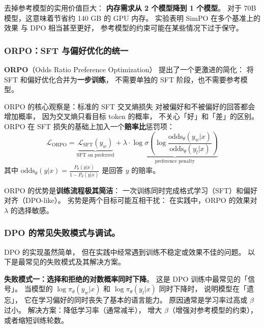 去掉参考模型的实用价值巨大：
\textbf{内存需求从 2 个模型降到 1 个模型}。
对于 70B 模型，这意味着节省约 140 GB 的 GPU 内存。
实验表明 SimPO 在多个基准上的效果
与 DPO 相当甚至更好，
参考模型的约束可能在某些情况下过于保守。

\subsubsection{ORPO：SFT 与偏好优化的统一}


\textbf{ORPO}（Odds Ratio Preference Optimization）
提出了一个更激进的简化：
将 SFT 和偏好优化合并为\textbf{一步训练}，
不需要单独的 SFT 阶段，也不需要参考模型。

ORPO 的核心观察是：标准的 SFT 交叉熵损失
对被偏好和不被偏好的回答都会增加概率，
因为交叉熵只看目标 token 的概率，
不关心「好」和「差」的区别。
ORPO 在 SFT 损失的基础上加入一个\textbf{赔率比}惩罚项：
\begin{equation}
  \mathcal{L}_{\text{ORPO}} = \underbrace{
    \mathcal{L}_{\text{SFT}}(y_w)
  }_{\text{SFT on preferred}} + \lambda \cdot \underbrace{
    \log \sigma\!\left(
      \log \frac{\text{odds}_\theta(y_w|x)}{\text{odds}_\theta(y_l|x)}
    \right)
  }_{\text{preference penalty}}
  \label{eq:orpo}
\end{equation}
其中 $\text{odds}_\theta(y|x) = \frac{P_\theta(y|x)}{1 - P_\theta(y|x)}$
是回答 $y$ 的赔率。

ORPO 的优势是\textbf{训练流程极其简洁}：
一次训练同时完成格式学习（SFT）和偏好对齐（DPO-like）。
劣势是两个目标可能互相干扰：
在实践中，ORPO 的效果对 $\lambda$ 的选择敏感。

\subsubsection{DPO 的常见失败模式与调试。}

DPO 的实现虽然简单，
但在实践中经常遇到训练不稳定或效果不佳的问题。
以下是最常见的失败模式及其解决方案。

\textbf{失败模式一：选择和拒绝的对数概率同时下降}。
这是 DPO 训练中最常见的「信号」。
当模型的 $\log \pi_\theta(y_w|x)$ 和
$\log \pi_\theta(y_l|x)$ 同时下降时，
说明模型在「遗忘」，
它在学习偏好的同时丧失了基本的语言能力。
原因通常是学习率过高或 $\beta$ 过小。
解决方案：降低学习率（通常减半），
增大 $\beta$（增强对参考模型的约束），
或者缩短训练轮数。

